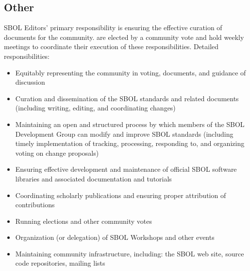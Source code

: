 \documentclass[11pt,a4paper,sans]{moderncv}        %
\begin{document}


\subsection{Other}

{}{}
{SBOL Editors' primary responsibility is ensuring the effective curation of documents for the community.  are elected by a community vote and hold weekly meetings to coordinate their execution of these responsibilities.
	\newline{}
	Detailed responsibilities:
	\begin{itemize}
		\item Equitably representing the community in voting, documents, and guidance of discussion
		\item Curation and dissemination of the SBOL standards and related documents (including writing, editing, and coordinating changes)
		\item Maintaining an open and structured process by which members of the SBOL Development Group can modify and improve SBOL standards (including timely implementation of tracking, processing, responding to, and organizing voting on change proposals)
		\item Ensuring effective development and maintenance of official SBOL software libraries and associated documentation and tutorials
		\item Coordinating scholarly publications and ensuring proper attribution of contributions
		\item Running elections and other community votes
		\item Organization (or delegation) of SBOL Workshops and other events
		\item Maintaining community infrastructure, including: the SBOL web site, source code repositories, mailing lists
\end{itemize}}
\end{document}
